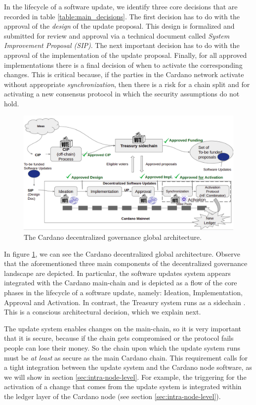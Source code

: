 In the lifecycle of a software update, we identify three core decisions that 
are 
recorded in table \ref{table:main_decisions}. The first decision has to do with 
the approval of the \emph{design} of the update proposal. This design is 
formalized and submitted for review and approval via a technical document 
called \emph{System Improvement Proposal (SIP)}. The next important decision 
has to do with the approval of the implementation of the update proposal. 
Finally, for all approved implementations there is a final decision of when to 
activate the corresponding changes. This is critical because, if the parties in 
the Cardano network activate without appropriate \emph{synchronization}, then 
there is a risk for a chain split and for activating a new consensus protocol 
in which the security assumptions do not hold.

\begin{figure}[h!] %
	\centering
	\includegraphics[width=0.8\columnwidth,
	keepaspectratio]{figures/cardano_dec_gov_landscape.png}
	\caption{The Cardano decentralized governance global architecture.}
	\label{fig:cardano_global_architecture}
\end{figure}

In figure \ref{fig:cardano_global_architecture}, we can see the Cardano 
decentralized global architecture. Observe that the aforementioned three main 
components of the decentralized governance landscape are depicted. In 
particular, the software updates system appears integrated with the Cardano 
main-chain and is depicted as a flow of the core phases in the lifecycle of a 
software update, namely: Ideation, Implementation, Approval and Activation. In 
contrast, the Treasury system runs as a sidechain \cite{sidechains}. This is a 
conscious architectural decision, which we explain next.

The update system enables changes on the main-chain, so it is very important 
that it is secure, because if the chain gets compromised or the protocol fails 
people can lose their money. So the chain upon which the update system runs 
must be \emph{at least} as secure as the main Cardano chain. This requirement 
calls for a tight integration between the update system and the Cardano node 
software, as we will show in section \ref{sec:intra-node-level}. For example, 
the triggering for the activation of a change that comes from the update system 
is integrated within the ledger layer of the Cardano node (see section 
\ref{sec:intra-node-level}). 

